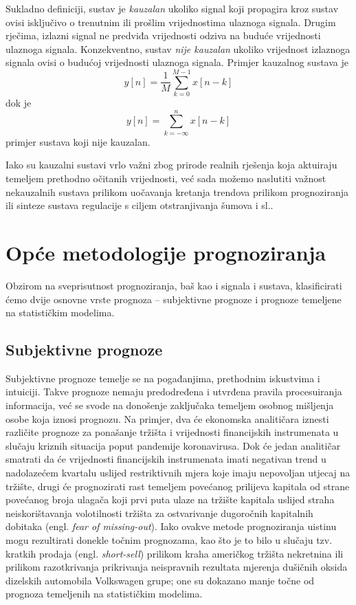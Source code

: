 \documentclass[a4paper,12pt,oneside]{memoir}
\newcommand{\kauzalni}{y[n]=\frac{1}{M}\displaystyle\sum_{k=0}^{M-1 }x[n-k]}
\newcommand{\nekauzalni}{y[n]=\displaystyle\sum_{k=-\infty}^{n}x[n-k]}
\begin{document}
                Sukladno definiciji, sustav je \textit{kauzalan} ukoliko signal koji propagira kroz sustav ovisi isključivo o trenutnim ili prošlim vrijednostima ulaznoga signala. Drugim rječima, izlazni signal ne predviđa vrijednosti odziva na buduće vrijednosti ulaznoga signala. Konzekventno, sustav \textit{nije kauzalan} ukoliko vrijednost izlaznoga signala ovisi o budućoj vrijednosti ulaznoga signala. Primjer kauzalnog sustava je
                \begin{equation}
                    \kauzalni
                \end{equation}
                dok je
                \begin{equation}
                    \nekauzalni
                \end{equation}
                primjer sustava koji nije kauzalan.

                Iako su kauzalni sustavi vrlo važni zbog prirode realnih rješenja koja aktuiraju temeljem prethodno očitanih vrijednosti, već sada možemo naslutiti važnost nekauzalnih sustava prilikom uočavanja kretanja trendova prilikom prognoziranja ili sinteze sustava regulacije s ciljem otstranjivanja šumova i sl..

    \chapter{Opće metodologije prognoziranja}
        Obzirom na sveprisutnost prognoziranja, baš kao i signala i sustava, klasificirati ćemo dvije osnovne vrste prognoza -- subjektivne prognoze i prognoze temeljene na statističkim modelima.\cite{Holden}

        \section{Subjektivne prognoze}
            Subjektivne prognoze temelje se na pogađanjima, prethodnim iskustvima i intuiciji. Takve prognoze nemaju predodređena i utvrđena pravila procesuiranja informacija, već se svode na donošenje zaključaka temeljem osobnog mišljenja osobe koja iznosi prognozu. Na primjer, dva će ekonomska analitičara iznesti različite prognoze za ponašanje tržišta i vrijednosti financijskih instrumenata u slučaju kriznih situacija poput pandemije koronavirusa. Dok će jedan analitičar smatrati da će vrijednosti financijskih instrumenata imati negativan trend u nadolazećem kvartalu uslijed restriktivnih mjera koje imaju nepovoljan utjecaj na tržište, drugi će prognozirati rast temeljem povećanog prilijeva kapitala od strane povećanog broja ulagača koji prvi puta ulaze na tržište kapitala uslijed straha neiskorištavanja volotilnosti tržišta za ostvarivanje dugoročnih kapitalnih dobitaka (engl. \textit{fear of missing-out}). Iako ovakve metode prognoziranja uistinu mogu rezultirati donekle točnim prognozama, kao što je to bilo u slučaju tzv. kratkih prodaja (engl. \textit{short-sell}) prilikom kraha američkog tržišta nekretnina ili prilikom razotkrivanja prikrivanja neispravnih rezultata mjerenja dušičnih oksida dizelskih automobila Volkswagen grupe; one su dokazano manje točne od prognoza temeljenih na statističkim modelima.
\end{document}
